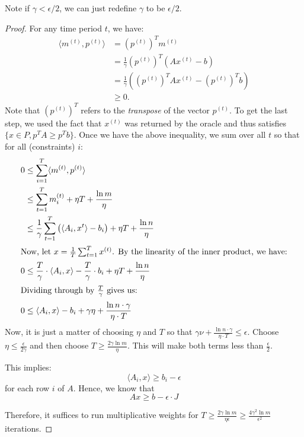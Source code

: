 \documentclass[11pt]{article}
\begin{document}
Note if $\gamma < \epsilon/2$, we can just redefine $\gamma$ to be $\epsilon/2$.

\begin{proof} 

For any time period $t$, we have: 
\begin{align*}
    \langle m^{(t)}, p^{(t)} \rangle &=  (p^{(t)})^T m^{(t)} \\ 
    &= \frac{1}{\gamma} (p^{(t)})^T \left( Ax^{(t)} - b \right) \\
    &= \frac{1}{\gamma} \left( (p^{(t)})^T Ax^{(t)} -(p^{(t)})^T b \right) \\
    &\geq 0 .
\end{align*}
Note that $(p^{(t)})^T$ refers to the \textit{transpose} of the vector $p^{(t)}$. To get the last step, we used the fact that $x^{(t)}$ was returned by the oracle and thus satisfies $\{x \in P, p^T A  \geq p^T b\}$. Once we have the above inequality, we sum over all $t$ so that for all (constraints) $i$: 
\begin{align*}
    0 &\leq \sum_{i=1}^{T} \langle m^{(t)}, p^{(t)} \rangle \\ 
    &\leq \sum_{t=1}^T m_i^{(t)} + \eta T + \frac{\ln m}{\eta} \\ 
    &\leq \frac{1}{\gamma}\sum_{t=1}^T \left( \langle A_i, x^t \rangle - b_i \right) + \eta T + \frac{\ln n}{\eta}\\
    \intertext{Now, let $x = \frac{1}{T} \sum_{t=1}^T x^{(t)}$. By the linearity of the inner product, we have:}
    0&\leq \frac{T}{\gamma} \cdot \langle A_i, x \rangle - \frac{T}{\gamma} \cdot b_i + \eta T + \frac{\ln n}{\eta} \\
    \intertext{Dividing through by $\frac{T}{\gamma}$ gives us:}
    0 &\leq \langle A_i, x\rangle - b_i + \gamma \eta + \frac{\ln n \cdot \gamma}{\eta \cdot T}
\end{align*}
Now, it is just a matter of choosing $\eta$ and $T$ so that $\gamma \nu + \frac{\ln n \cdot \gamma}{\eta \cdot T} \leq \epsilon$. Choose $\eta \leq \frac{\epsilon}{2\gamma}$ and then choose $T \geq \frac{2\gamma \ln m}{\eta}$. This will make both terms less than $\frac{\epsilon}{2}$. 

This implies: 
$$ \langle A_i, x \rangle \geq b_i - \epsilon$$ 
for each row $i$ of $A$. Hence, we know that
$$ Ax \geq b - \epsilon \cdot J$$ 

Therefore, it suffices to run multiplicative weights for $T \geq \frac{2 \gamma \ln m}{\eta \epsilon} \geq \frac{4 \gamma^2 \ln m}{\epsilon^2}$ iterations. 
\end{proof}
\end{document}
